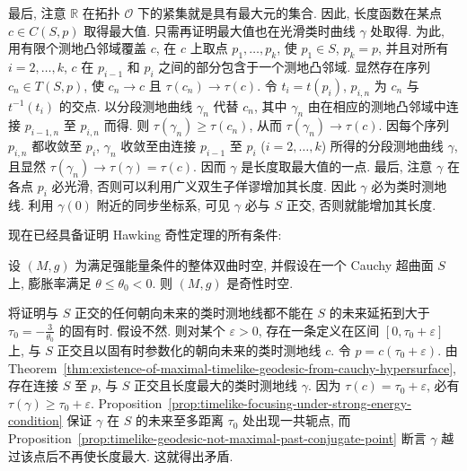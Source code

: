 \begin{RiemannProof}
最后, 注意 $\mathbb{R}$ 在拓扑 $\mathcal{O}$ 下的紧集就是具有最大元的集合. 因此, 长度函数在某点 $c\in C(S,p)$ 取得最大值. 只需再证明最大值也在光滑类时曲线 $\gamma$ 处取得. 为此, 用有限个测地凸邻域覆盖 $c$, 在 $c$ 上取点 $p_1,\ldots,p_k$, 使 $p_1\in S$, $p_k=p$, 并且对所有 $i=2,\ldots,k$, $c$ 在 $p_{i-1}$ 和 $p_i$ 之间的部分包含于一个测地凸邻域. 显然存在序列 $c_n\in T(S,p)$, 使 $c_n\to c$ 且 $\tau(c_n)\to\tau(c)$. 令 $t_i=t(p_i)$, $p_{i,n}$ 为 $c_n$ 与 $t^{-1}(t_i)$ 的交点. 以分段测地曲线 $\gamma_n$ 代替 $c_n$, 其中 $\gamma_n$ 由在相应的测地凸邻域中连接 $p_{i-1,n}$ 至 $p_{i,n}$ 而得. 则 $\tau(\gamma_n)\geq\tau(c_n)$, 从而 $\tau(\gamma_n)\to\tau(c)$. 因每个序列 $p_{i,n}$ 都收敛至 $p_i$, $\gamma_n$ 收敛至由连接 $p_{i-1}$ 至 $p_i$ ($i=2,\ldots,k$) 所得的分段测地曲线 $\gamma$, 且显然 $\tau(\gamma_n)\to\tau(\gamma)=\tau(c)$. 因而 $\gamma$ 是长度取最大值的一点. 最后, 注意 $\gamma$ 在各点 $p_i$ 必光滑, 否则可以利用广义双生子佯谬增加其长度. 因此 $\gamma$ 必为类时测地线. 利用 $\gamma(0)$ 附近的同步坐标系, 可见 $\gamma$ 必与 $S$ 正交, 否则就能增加其长度.
\end{RiemannProof}

现在已经具备证明 Hawking 奇性定理的所有条件:

\begin{RiemannTheorem}[Hawking]\label{thm:hawking-timelike-singularity}
设 $(M,g)$ 为满足强能量条件的整体双曲时空, 并假设在一个 Cauchy 超曲面 $S$ 上, 膨胀率满足 $\theta\leq\theta_0<0$. 则 $(M,g)$ 是奇性时空.
\end{RiemannTheorem}

\begin{RiemannProof}
将证明与 $S$ 正交的任何朝向未来的类时测地线都不能在 $S$ 的未来延拓到大于 $\tau_0=-\frac{3}{\theta_0}$ 的固有时. 假设不然. 则对某个 $\varepsilon>0$, 存在一条定义在区间 $[0,\tau_0+\varepsilon]$ 上, 与 $S$ 正交且以固有时参数化的朝向未来的类时测地线 $c$. 令 $p=c(\tau_0+\varepsilon)$. 由 Theorem~\ref{thm:existence-of-maximal-timelike-geodesic-from-cauchy-hypersurface}, 存在连接 $S$ 至 $p$, 与 $S$ 正交且长度最大的类时测地线 $\gamma$. 因为 $\tau(c)=\tau_0+\varepsilon$, 必有 $\tau(\gamma)\geq\tau_0+\varepsilon$. Proposition~\ref{prop:timelike-focusing-under-strong-energy-condition} 保证 $\gamma$ 在 $S$ 的未来至多距离 $\tau_0$ 处出现一共轭点, 而 Proposition~\ref{prop:timelike-geodesic-not-maximal-past-conjugate-point} 断言 $\gamma$ 越过该点后不再使长度最大. 这就得出矛盾.
\end{RiemannProof}

